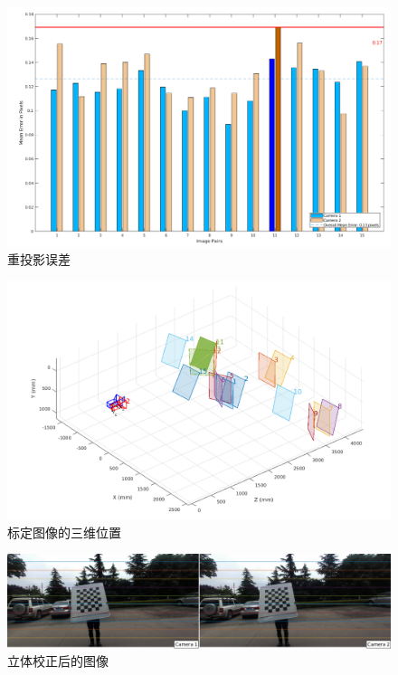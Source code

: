\vspace{0.3in} %
\begin{figure}[htb] %
	\centering
	\includegraphics[width=5in]{figures/2_2_reprojection_errors}
	\caption{重投影误差}\label{fig:2_2_reprojection_errors}
\end{figure}

\begin{figure}[htb] %
	\centering
	\includegraphics[width=5in]{figures/2_2_extrinsics}
	\caption{标定图像的三维位置}\label{fig:2_2_extrinsics}
\end{figure}

\begin{figure}[htb] %
	\centering
	\includegraphics[width=6in]{figures/2_2_rectified_image}
	\caption{立体校正后的图像}\label{fig:2_2_rectified_image}
\end{figure}



